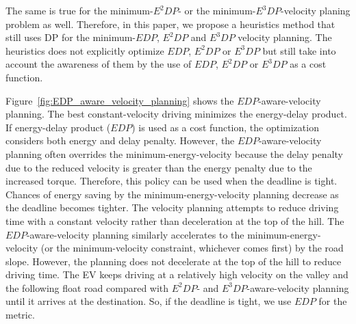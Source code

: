 \documentclass{IEEEtran}
\begin{document}
The same is true for the minimum-$E^2DP$- or the minimum-$E^3DP$-velocity planing problem as well. Therefore, in this paper, we propose a heuristics method that still uses DP for the minimum-$EDP$, $E^2DP$ and $E^3DP$ velocity planning. The heuristics does not explicitly optimize $EDP$, $E^2DP$ or $E^3DP$ but still take into account the awareness of them by the use of $EDP$, $E^2DP$ or $E^3DP$ as a cost function. 

Figure~\ref{fig:EDP_aware_velocity_planning} shows the $EDP$-aware-velocity planning. The best constant-velocity driving minimizes the energy-delay product.
If energy-delay product ($EDP$) is used as a cost function, the optimization considers both energy and delay penalty. However, the $EDP$-aware-velocity planning often overrides the minimum-energy-velocity because the delay penalty due to the reduced velocity is greater than the energy penalty due to the increased torque. Therefore, this policy can be used when the deadline is tight. Chances of energy saving by the minimum-energy-velocity planning decrease as the deadline becomes tighter. 
The velocity planning attempts to reduce driving time with a constant velocity rather than deceleration at the top of the hill. 
%
The $EDP$-aware-velocity planning similarly accelerates to the minimum-energy-velocity (or the minimum-velocity constraint, whichever comes first) by the road slope. However, the planning does not decelerate at the top of the hill to reduce driving time. 
The EV keeps driving at a relatively high velocity on the valley and the following float road compared with $E^2DP$- and $E^3DP$-aware-velocity planning until it arrives at the destination. So, if the deadline is tight, we use $EDP$ for the metric.
\end{document}
